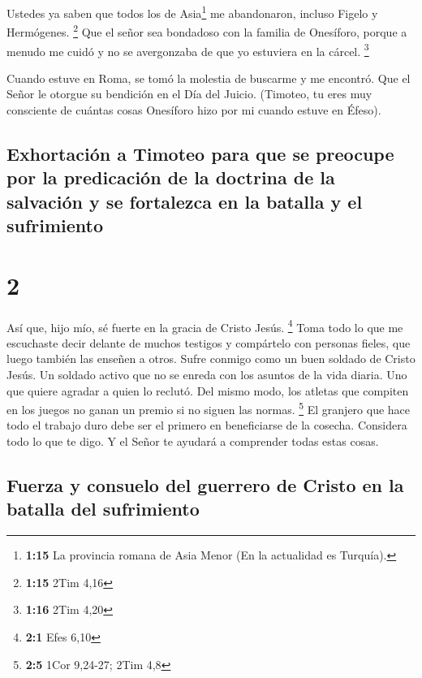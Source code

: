  Ustedes ya saben que todos los de Asia\footnote{\textbf{1:15}
  La provincia romana de Asia Menor (En la actualidad es Turquía).} me
abandonaron, incluso Figelo y Hermógenes. \footnote{\textbf{1:15} 2Tim
  4,16}  Que el señor sea bondadoso con la familia de
Onesíforo, porque a menudo me cuidó y no se avergonzaba de que yo
estuviera en la cárcel. \footnote{\textbf{1:16} 2Tim 4,20}

 Cuando estuve en Roma, se tomó la molestia de buscarme y
me encontró.  Que el Señor le otorgue su bendición en el
Día del Juicio. (Timoteo, tu eres muy consciente de cuántas cosas
Onesíforo hizo por mi cuando estuve en Éfeso).

\hypertarget{exhortaciuxf3n-a-timoteo-para-que-se-preocupe-por-la-predicaciuxf3n-de-la-doctrina-de-la-salvaciuxf3n-y-se-fortalezca-en-la-batalla-y-el-sufrimiento}{%
\subsection{Exhortación a Timoteo para que se preocupe por la
predicación de la doctrina de la salvación y se fortalezca en la batalla
y el
sufrimiento}\label{exhortaciuxf3n-a-timoteo-para-que-se-preocupe-por-la-predicaciuxf3n-de-la-doctrina-de-la-salvaciuxf3n-y-se-fortalezca-en-la-batalla-y-el-sufrimiento}}

\hypertarget{section-1}{%
\section{2}\label{section-1}}

 Así que, hijo mío, sé fuerte en la gracia de Cristo
Jesús. \footnote{\textbf{2:1} Efes 6,10}  Toma todo lo que
me escuchaste decir delante de muchos testigos y compártelo con personas
fieles, que luego también las enseñen a otros.  Sufre
conmigo como un buen soldado de Cristo Jesús.  Un soldado
activo que no se enreda con los asuntos de la vida diaria. Uno que
quiere agradar a quien lo reclutó.  Del mismo modo, los
atletas que compiten en los juegos no ganan un premio si no siguen las
normas. \footnote{\textbf{2:5} 1Cor 9,24-27; 2Tim 4,8}  El
granjero que hace todo el trabajo duro debe ser el primero en
beneficiarse de la cosecha.  Considera todo lo que te
digo. Y el Señor te ayudará a comprender todas estas cosas.

\hypertarget{fuerza-y-consuelo-del-guerrero-de-cristo-en-la-batalla-del-sufrimiento}{%
\subsection{Fuerza y \hspace{0pt}\hspace{0pt}consuelo del guerrero de
Cristo en la batalla del
sufrimiento}\label{fuerza-y-consuelo-del-guerrero-de-cristo-en-la-batalla-del-sufrimiento}}

